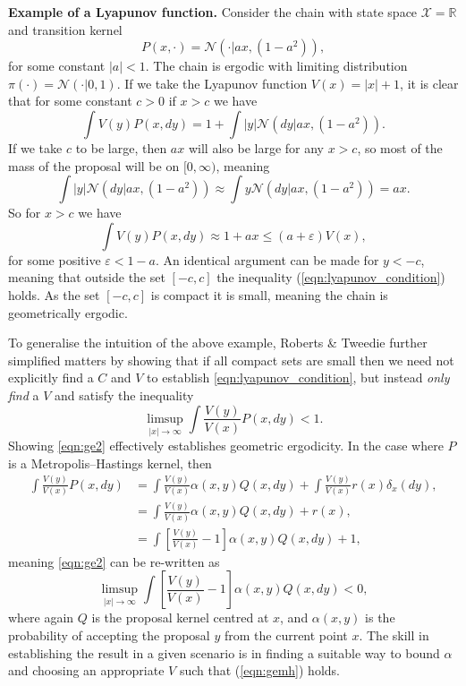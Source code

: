 \documentclass{article}
\newcommand{\X}{\mathcal{X}}
\begin{document}
\vspace{0.3cm}
{\color{darkblue}
\textbf{Example of a Lyapunov function.}  Consider the chain with state space $\X = \mathbb{R}$ and transition kernel
\[
P(x,\cdot) = \mathcal{N}(\cdot|ax, (1-a^2)),
\]
for some constant $|a|<1$.  The chain is ergodic with limiting distribution $\pi(\cdot) = \mathcal{N}(\cdot|0,1)$.  If we take the Lyapunov function $V(x) = |x| + 1$, it is clear that for some constant $c>0$ if $x > c$ we have
\[
\int V(y) P(x,dy) = 1 + \int |y| \mathcal{N}(dy|ax, (1-a^2)).
\]
If we take $c$ to be large, then $ax$ will also be large for any $x>c$, so most of the mass of the proposal will be on $[0,\infty)$, meaning
\[
\int |y| \mathcal{N}(dy|ax, (1-a^2)) \approx \int y \mathcal{N}(dy|ax, (1-a^2)) = ax.
\]
So for $x > c$ we have
\[
\int V(y) P(x,dy) \approx 1 + ax \leq (a+\varepsilon)V(x),
\]
for some positive $\varepsilon < 1-a$.  An identical argument can be made for $y < -c$, meaning that outside the set $[-c,c]$ the inequality (\ref{eqn:lyapunov_condition}) holds.  As the set $[-c,c]$ is compact it is small, meaning the chain is geometrically ergodic.
}
\vspace{0.3cm}

To generalise the intuition of the above example, Roberts \& Tweedie \cite{roberts1996geometric} further simplified matters by showing that if all compact sets are small then we need not explicitly find a $C$ and $V$ to establish \eqref{eqn:lyapunov_condition}, but instead \emph{only find} a $V$ and satisfy the inequality
\begin{equation} \label{eqn:ge2}
\limsup_{|x| \to \infty} \int \frac{V(y)}{V(x)} P(x,dy) < 1.
\end{equation}
Showing \eqref{eqn:ge2} effectively  establishes geometric ergodicity.  In the case where $P$ is a Metropolis--Hastings kernel, then
\begin{align*}
\int \frac{V(y)}{V(x)}P(x,dy) &= \int \frac{V(y)}{V(x)}\alpha(x,y)Q(x,dy) + \int \frac{V(y)}{V(x)}r(x)\delta_x(dy), \\
&= \int \frac{V(y)}{V(x)}\alpha(x,y)Q(x,dy) + r(x), \\
&= \int \left[ \frac{V(y)}{V(x)} - 1\right] \alpha(x,y)Q(x,dy) + 1,
\end{align*}
meaning \eqref{eqn:ge2} can be re-written as
\begin{equation} \label{eqn:gemh}
\limsup_{|x| \to \infty} \int \left[ \frac{V(y)}{V(x)} - 1 \right] \alpha(x,y)Q(x,dy) < 0,
\end{equation}
where again $Q$ is the proposal kernel centred at $x$, and $\alpha(x,y)$ is the probability of accepting the proposal $y$ from the current point $x$.  The skill in establishing the result in a given scenario is in finding a suitable way to bound $\alpha$ and choosing an appropriate $V$ such that (\ref{eqn:gemh}) holds.
\end{document}
